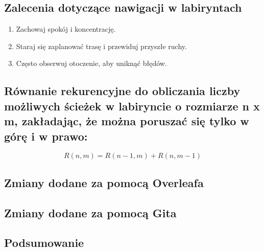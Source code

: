 \subsection{Zalecenia dotyczące nawigacji w labiryntach}
\begin{enumerate}
    \item Zachowaj spokój i koncentrację.
    \item Staraj się zaplanować trasę i przewiduj przyszłe ruchy.
    \item Często obserwuj otoczenie, aby uniknąć błędów.
\end{enumerate}

\subsection{Równanie rekurencyjne do obliczania liczby możliwych ścieżek w labiryncie o rozmiarze n x m, zakładając, że można poruszać się tylko w górę i w prawo:}
\[R(n, m) = R(n-1, m) + R(n, m-1)\]

\subsection{Zmiany dodane za pomocą Overleafa}

\subsection{Zmiany dodane za pomocą Gita}

\subsection{Podsumowanie}

